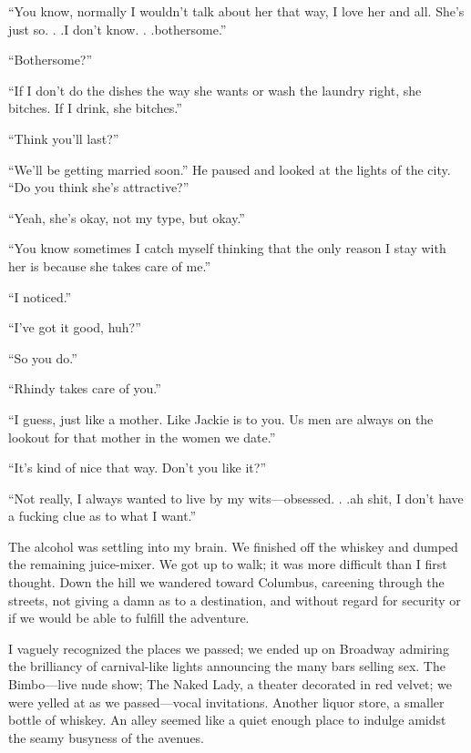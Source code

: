 ``You know, normally I wouldn't talk about her that way, I love her and
all. She's just so. . .I don't know. . .bothersome.''

``Bothersome?''

``If I don't do the dishes the way she wants or wash the laundry right,
she bitches. If I drink, she bitches.''

``Think you'll last?''

``We'll be getting married soon.'' He paused and looked at the lights of
the city. ``Do you think she's attractive?''

``Yeah, she's okay, not my type, but okay.''

``You know sometimes I catch myself thinking that the only reason I stay
with her is because she takes care of me.''

``I noticed.''

``I've got it good, huh?''

``So you do.''

``Rhindy takes care of you.''

``I guess, just like a mother. Like Jackie is to you. Us men are always
on the lookout for that mother in the women we date.''

``It's kind of nice that way. Don't you like it?''

``Not really, I always wanted to live by my wits---obsessed. . .ah shit,
I don't have a fucking clue as to what I want.''

The alcohol was settling into my brain. We finished off the whiskey and
dumped the remaining juice-mixer. We got up to walk; it was more
difficult than I first thought. Down the hill we wandered toward
Columbus, careening through the streets, not giving a damn as to a
destination, and without regard for security or if we would be able to
fulfill the adventure.

I vaguely recognized the places we passed; we ended up on Broadway
admiring the brilliancy of carnival-like lights announcing the many bars
selling sex. The Bimbo---live nude show; The Naked Lady, a theater
decorated in red velvet; we were yelled at as we passed---vocal
invitations. Another liquor store, a smaller bottle of whiskey. An alley
seemed like a quiet enough place to indulge amidst the seamy busyness of
the avenues.

